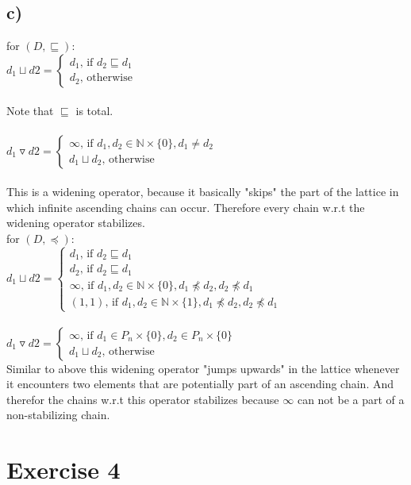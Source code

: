 \documentclass[fleqn,12pt]{article}
\begin{document}
\subsection*{c)}
for $(D,\sqsubseteq)$:\\
$d_1 \sqcup d2 =
\begin{cases}
d_1 \text{, if } d_2 \sqsubseteq d_1 \\
d_2 \text{, otherwise}
\end{cases}$\\\\
Note that $\sqsubseteq$ is total.\\\\
$d_1 \triangledown d2 =
\begin{cases}
\infty \text{, if } d_1,d_2 \in \mathbb{N} \times \{0\}, d_1 \neq d_2 \\
d_1 \sqcup d_2 \text{, otherwise}
\end{cases}$\\\\
This is a widening operator, because it basically "skips" the part of the lattice in which infinite ascending chains can occur.
Therefore every chain w.r.t the widening operator stabilizes.\\
for $(D,\preceq)$:\\
$d_1 \sqcup d2 =
\begin{cases}
d_1 \text{, if } d_2 \sqsubseteq d_1 \\
d_2 \text{, if } d_2 \sqsubseteq d_1 \\
\infty \text{, if } d_1,d_2 \in \mathbb{N}\times \{0\}, d_1 \not\preceq d_2, d_2 \not\preceq d_1 \\
(1,1) \text{, if } d_1,d_2 \in \mathbb{N}\times \{1\}, d_1 \not\preceq d_2, d_2 \not\preceq d_1
\end{cases}$\\\\

$d_1 \triangledown d2 =
\begin{cases}
\infty \text{, if } d_1 \in P_n \times \{0\}, d_2 \in P_n \times \{0\} \\
d_1 \sqcup d_2 \text{, otherwise}
\end{cases}$\\
Similar to above this widening operator "jumps upwards" in the lattice whenever it encounters two elements that are potentially part of an ascending chain.
And therefor the chains w.r.t this operator stabilizes because $\infty$ can not be a part of a non-stabilizing chain.
\section*{Exercise 4}
\end{document}
